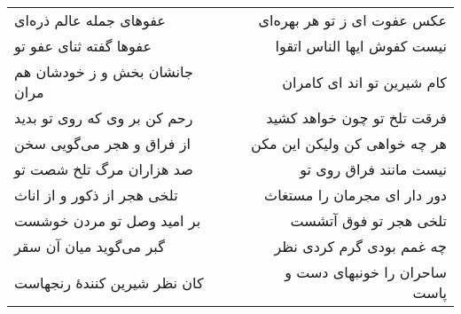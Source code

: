 \begin{center}
\begin{longtable}{l p{0.5cm} r}
عفوهای جمله عالم ذره‌ای
&&
عکس عفوت ای ز تو هر بهره‌ای
\\
عفوها گفته ثنای عفو تو
&&
نیست کفوش ایها الناس اتقوا
\\
جانشان بخش و ز خودشان هم مران
&&
کام شیرین تو اند ای کامران
\\
رحم کن بر وی که روی تو بدید
&&
فرقت تلخ تو چون خواهد کشید
\\
از فراق و هجر می‌گویی سخن
&&
هر چه خواهی کن ولیکن این مکن
\\
صد هزاران مرگ تلخ شصت تو
&&
نیست مانند فراق روی تو
\\
تلخی هجر از ذکور و از اناث
&&
دور دار ای مجرمان را مستغاث
\\
بر امید وصل تو مردن خوشست
&&
تلخی هجر تو فوق آتشست
\\
گبر می‌گوید میان آن سقر
&&
چه غمم بودی گرم کردی نظر
\\
کان نظر شیرین کنندهٔ رنجهاست
&&
ساحران را خونبهای دست و پاست
\\
\end{longtable}
\end{center}
